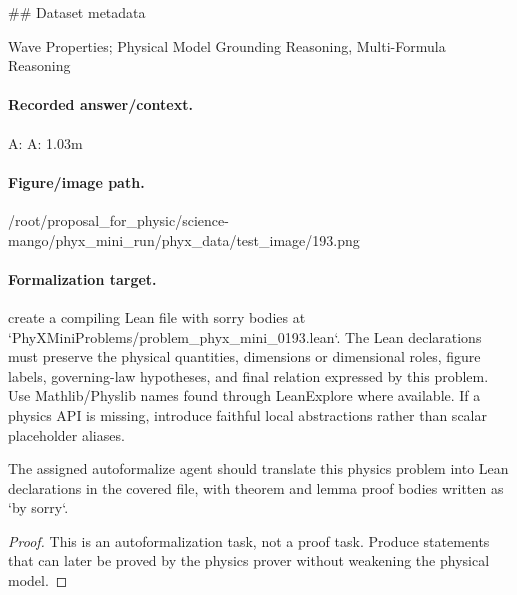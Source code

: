 \#\# Dataset metadata

Wave Properties; Physical Model Grounding Reasoning, Multi-Formula Reasoning

\paragraph{Recorded answer/context.}
A: A: 1.03m

\paragraph{Figure/image path.}
/root/proposal\_for\_physic/science-mango/phyx\_mini\_run/phyx\_data/test\_image/193.png

\paragraph{Formalization target.}
create a compiling Lean file with sorry bodies at `PhyXMiniProblems/problem\_phyx\_mini\_0193.lean`. The Lean declarations must preserve the physical quantities, dimensions or dimensional roles, figure labels, governing-law hypotheses, and final relation expressed by this problem.
Use Mathlib/Physlib names found through LeanExplore where available. If a physics API is missing, introduce faithful local abstractions rather than scalar placeholder aliases.

\begin{theorem}
\label{thm:physics:phyx_mini_0193:target}
The assigned autoformalize agent should translate this physics problem into Lean declarations in the covered file, with theorem and lemma proof bodies written as `by sorry`.
\end{theorem}
\begin{proof}
This is an autoformalization task, not a proof task. Produce statements that can later be proved by the physics prover without weakening the physical model.
\end{proof}

